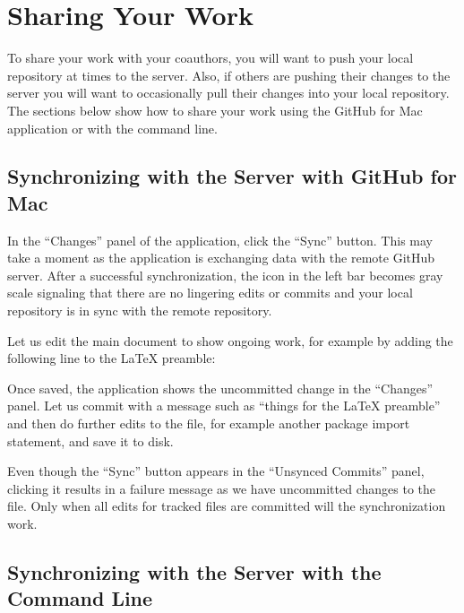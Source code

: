 \section{Sharing Your Work} \label{sec:sharing}

To share your work with your coauthors, you will want to push your local repository at times to the server.  Also, if others are pushing their changes to the server you will want to occasionally pull their changes into your local repository.  The sections below show how to share your work using the GitHub for Mac application or with the command line.

\subsection{Synchronizing with the Server with GitHub for Mac}

In the ``Changes'' panel of the application, click the ``Sync'' button.  This may take a moment as the application is exchanging data with the remote GitHub server.  After a successful synchronization, the icon in the left bar becomes gray scale signaling that there are no lingering edits or commits and your local repository is in sync with the remote repository.

Let us edit the main document to show ongoing work, for example by adding the following line to the LaTeX preamble:
\begin{FileVerbatim}
\usepackage{url} %
\end{FileVerbatim}
Once saved, the application shows the uncommitted change in the ``Changes'' panel.  Let us commit with a message such as ``things for the LaTeX preamble'' and then do further edits to the file, for example another package import statement, and save it to disk.
\begin{FileVerbatim}
\usepackage{color}
\end{FileVerbatim}
Even though the ``Sync'' button appears in the ``Unsynced Commits'' panel, clicking it results in a failure message as we have uncommitted changes to the file.  Only when all edits for tracked files are committed will the synchronization work.

\subsection{Synchronizing with the Server with the Command Line}

